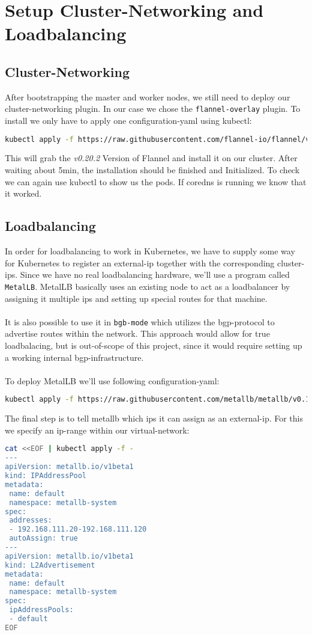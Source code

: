 \section{Setup Cluster-Networking and Loadbalancing}
\subsection{Cluster-Networking}
After bootstrapping the master and worker nodes, we still need to deploy our cluster-networking plugin. In our case we chose the \texttt{flannel-overlay} plugin.
To install we only have to apply one configuration-yaml using kubectl:
\begin{lstlisting}[language=bash,caption=Deploy Flannel-Networking] 
kubectl apply -f https://raw.githubusercontent.com/flannel-io/flannel/v0.20.2/Documentation/kube-flannel.yml
\end{lstlisting}
This will grab the \textit{v0.20.2} Version of Flannel and install it on our cluster.
After waiting about 5min, the installation should be finished and Initialized. To check we can again use kubectl to show us the pods. If coredns is running we know that it worked.
\subsection{Loadbalancing}
In order for loadbalancing to work in Kubernetes, we have to supply some way for Kubernetes to register an external-ip together with the corresponding cluster-ips. Since we have no real loadbalancing hardware, we'll use a program called \texttt{MetalLB}.
MetalLB basically uses an existing node to act as a loadbalancer by assigning it multiple ips and setting up special routes for that machine.\\\\It is also possible to use it in \texttt{bgb-mode} which utilizes the bgp-protocol to advertise routes within the network. This approach would allow for true loadbalacing, but is out-of-scope of this project, since it would require setting up a working internal bgp-infrastructure.\\\\To deploy MetalLB we'll use following configuration-yaml:
\begin{lstlisting}[language=bash,caption=Deploy MetalLB Loadbalacing] 
kubectl apply -f https://raw.githubusercontent.com/metallb/metallb/v0.13.7/config/manifests/metallb-native.yaml
\end{lstlisting}
\noindent The final step is to tell metallb which ips it can assign as an external-ip. For this we specify an ip-range within our virtual-network:
\begin{lstlisting}[language=bash,caption=Set assinable IP-Ranges for external IPs] 
cat <<EOF | kubectl apply -f -
---
apiVersion: metallb.io/v1beta1
kind: IPAddressPool
metadata:
 name: default
 namespace: metallb-system
spec:
 addresses:
 - 192.168.111.20-192.168.111.120
 autoAssign: true
---
apiVersion: metallb.io/v1beta1
kind: L2Advertisement
metadata:
 name: default
 namespace: metallb-system
spec:
 ipAddressPools:
 - default
EOF
\end{lstlisting}

